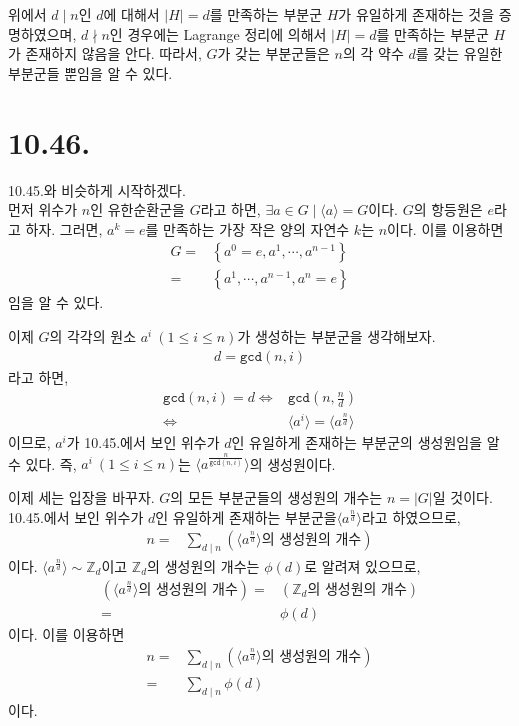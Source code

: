 \documentclass{article}
\begin{document}
위에서 $d \mid n$인 $d$에 대해서 $\left|H \right| = d$를 만족하는 부분군 $H$가 유일하게 존재하는 것을 증명하였으며, $d \nmid n$인 경우에는 Lagrange 정리에 의해서 $\left|H \right| = d$를 만족하는 부분군 $H$가 존재하지 않음을 안다. 따라서, $G$가 갖는 부분군들은 $n$의 각 약수 $d$를 갖는 유일한 부분군들 뿐임을 알 수 있다.


\section{10.46.}
10.45.와 비슷하게 시작하겠다. 
\\먼저 위수가 $n$인 유한순환군을 $G$라고 하면, $\exists a \in G \mid \langle a \rangle = G$이다. $G$의 항등원은 $e$라고 하자. 그러면, $a^k=e$를 만족하는 가장 작은 양의 자연수 $k$는 $n$이다. 이를 이용하면
\begin{align*}
G =& \left\{a^0 = e, a^1, \cdots, a^{n-1} \right\}
\\ =& \left\{a^1, \cdots, a^{n-1}, a^n = e \right\}
\end{align*}임을 알 수 있다.

이제 $G$의 각각의 원소 $a^i \: (1 \le i \le n)$가 생성하는 부분군을 생각해보자.
\begin{align*}
d = \texttt{gcd}(n, i)
\end{align*}라고 하면,
\begin{align*}
\texttt{gcd}(n, i) = d \iff& \texttt{gcd}(n, \frac{n}{d})
\\ \iff& \langle a^i \rangle = \langle a^{\frac{n}{d}} \rangle
\end{align*}이므로, $a^i$가 10.45.에서 보인 위수가 $d$인 유일하게 존재하는 부분군의 생성원임을 알 수 있다. 즉,  $a^i \: (1 \le i \le n)$는 $\langle a^{\frac{n}{\texttt{gcd}(n, i)}} \rangle$의 생성원이다.

이제 세는 입장을 바꾸자. $G$의 모든 부분군들의 생성원의 개수는 $n = \left|G\right|$일 것이다. 10.45.에서 보인 위수가 $d$인 유일하게 존재하는 부분군을$\langle a^{\frac{n}{d}} \rangle$라고 하였으므로,
\begin{align*}
n =& \sum_{d \mid n}^{} \left( \langle a^{\frac{n}{d}} \rangle \text{의 생성원의 개수} \right)
\end{align*}이다. $\langle a^{\frac{n}{d}} \rangle \sim \mathbb{Z}_d$이고 $\mathbb{Z}_d$의 생성원의 개수는 $\phi (d)$로 알려져 있으므로,
\begin{align*}
\left( \langle a^{\frac{n}{d}} \rangle \text{의 생성원의 개수} \right) =& \left( \mathbb{Z}_d \text{의 생성원의 개수} \right)
\\ =& \phi(d) 
\end{align*}이다. 이를 이용하면
\begin{align*}
n =& \sum_{d \mid n}^{} \left( \langle a^{\frac{n}{d}} \rangle \text{의 생성원의 개수} \right)
\\ =& \sum_{d \mid n}^{} \phi(d)
\end{align*}이다.
\end{document}
